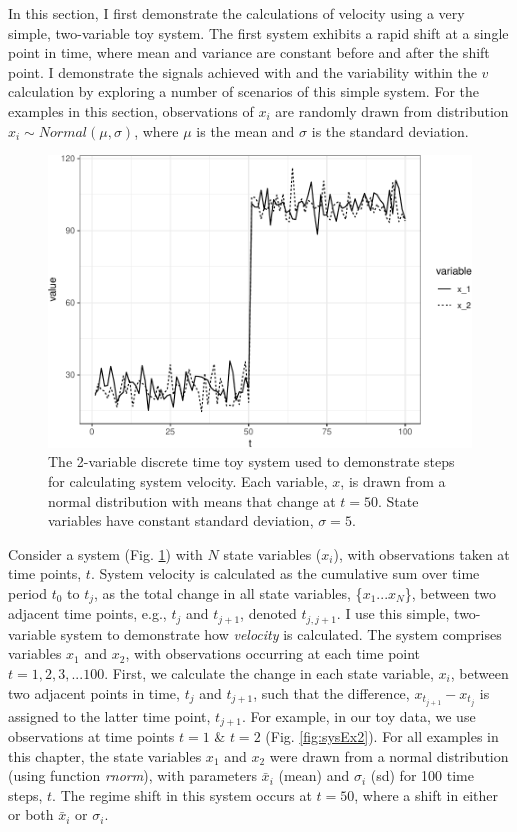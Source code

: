 \documentclass[12pt,twoside,openany]{reedthesis}
\begin{document}
In this section, I first demonstrate the calculations of velocity using a very simple, two-variable toy system. The first system exhibits a rapid shift at a single point in time, where mean and variance are constant before and after the shift point. I demonstrate the signals achieved with and the variability within the \(v\) calculation by exploring a number of scenarios of this simple system. For the examples in this section, observations of \(x_i\) are randomly drawn from distribution \(x_i\sim Normal(\mu, \sigma)\), where \(\mu\) is the mean and \(\sigma\) is the standard deviation.
\begin{figure}
\includegraphics[width=0.85\linewidth]{_myDissertation_files/figure-latex/sysEx-1} \caption{The 2-variable discrete time toy system used to demonstrate steps for calculating system velocity. Each variable, $x$, is drawn from a normal distribution with means that change at $t = 50$. State variables have constant standard deviation, $\sigma = 5$.}\label{fig:sysEx}
\end{figure}
Consider a system (Fig. \ref{fig:sysEx}) with \(N\) state variables (\(x_i\)), with observations taken at time points, \(t\). System velocity is calculated as the cumulative sum over time period \(t_0\) to \(t_j\), as the total change in all state variables, \{\(x_1 ...x_N\)\}, between two adjacent time points, e.g., \(t_j\) and \(t_{j+1}\), denoted \(t_{j,j+1}\). I use this simple, two-variable system to demonstrate how \emph{velocity} is calculated. The system comprises variables \(x_1\) and \(x_2\), with observations occurring at each time point \(t = {1,2,3,...100}\). First, we calculate the change in each state variable, \(x_i\), between two adjacent points in time, \(t_j\) and \(t_{j+1}\), such that the difference, \(x_{t_{j+1}} - x_{t_j}\) is assigned to the latter time point, \(t_{j+1}\). For example, in our toy data, we use observations at time points \(t = 1\) \& \(t=2\) (Fig. \ref{fig:sysEx2}). For all examples in this chapter, the state variables \(x_1\) and \(x_2\) were drawn from a normal distribution (using function \emph{rnorm}), with parameters \(\bar{x}_i\) (mean) and \(\sigma_i\) (sd) for 100 time steps, \(t\). The regime shift in this system occurs at \(t=50\), where a shift in either or both \(\bar{x}_i\) or \(\sigma_i\).
\end{document}
